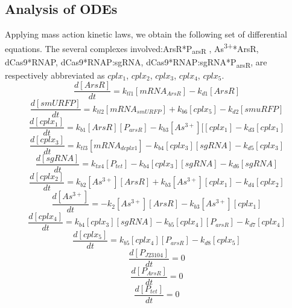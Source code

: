 \subsection{Analysis of ODEs}
Applying mass action kinetic laws, we obtain the following set of differential equations. The several complexes involved:ArsR*P\textsubscript{arsR} , As\textsuperscript{3+}*ArsR, dCas9*RNAP, dCas9*RNAP:sgRNA, dCas9*RNAP:sgRNA*P\textsubscript{arsR}, are respectively abbreviated as $cplx_1$, $cplx_2$, $cplx_3$, $cplx_4$, $cplx_5$.
\begin{equation}
	\frac{d[ArsR]}{dt}=k_{tl1}[mRNA_{ArsR}]-k_{d1}[ArsR]\tag{1}
\end{equation}
\begin{equation}
	\frac{d[smURFP]}{dt}=k_{tl2}[mRNA_{smURFP}]+k_{b6}[cplx_5]-k_{d2}[smuRFP]\tag{2}
\end{equation}
\begin{equation}
	\frac{d[cplx_1]}{dt}=k_{b1}[ArsR][P_{arsR}]-k_{b3}[As^{3+}][[cplx_1]-k_{d3}[cplx_1] \tag{3}
\end{equation}
\begin{equation}
	\frac{d[cplx_3]}{dt}=k_{tl3}[mRNA_{dcplx1}]-k_{b4}[cplx_3][sgRNA]-k_{d5}[cplx_3] \tag{4}
\end{equation}
\begin{equation}
	\frac{d[sgRNA]}{dt}=k_{tx4}[P_{tet}]-k_{b4}[cplx_3][sgRNA]-k_{d6}[sgRNA] \tag{5}
\end{equation}
\begin{equation}
	\frac{d[cplx_2]}{dt}=k_{b2}[As^{3+}][ArsR]+k_{b3}[As^{3+}][cplx_1]-k_{d4}[cplx_2] \tag{6}
\end{equation}
\begin{equation}
	\frac{d[As^{3+}]}{dt}=-k_{2}[As^{3+}][ArsR]-k_{b3}[As^{3+}][cplx_1] \tag{7}
\end{equation}
\begin{equation}
	\frac{d[cplx_4]}{dt}=k_{b4}[cplx_3][sgRNA]-k_{b5}[cplx_4][P_{arsR}]-k_{d7}[cplx_4]\tag{8}
\end{equation}
\begin{equation}
	\frac{d[cplx_5]}{dt}=k_{b5}[cplx_4][P_{arsR}]-k_{d8}[cplx_5]\tag{9}
\end{equation} 
\begin{equation}
	\frac{d[P_{J23104}]}{dt}=0\tag{10}
\end{equation} 
\begin{equation}
	\frac{d[P_{ArsR}]}{dt}=0\tag{11}
\end{equation} 
\begin{equation}
	\frac{d[P_{tet}]}{dt}=0\tag{12}
\end{equation} 
